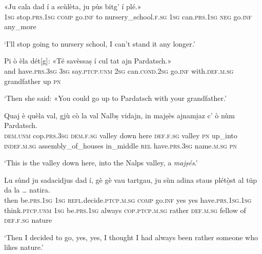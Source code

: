 \begin{linenumbers}
\gll  «Ju cala dad í a scùlèta, ju pùs bitg' í plé.»\\
 \textsc{1sg} stop.\textsc{prs.1sg} \textsc{comp} go.\textsc{inf} to nursery\_school.\textsc{f.sg} \textsc{1sg} can.\textsc{prs.1sg} \textsc{neg} go.\textsc{inf} any\_more  \\
\end{linenumbers}
\medskip
\glt `I’ll stop going to nursery school, I can’t stand it any longer.'
\medskip

\begin{linenumbers}
\gll  Pi ò èla dét[g]: «Té savèssaṣ í cul tat ajn Pardatsch.»  \\
and have.\textsc{prs.3sg} \textsc{3sg} say.\textsc{ptcp.unm} \textsc{2sg} can.\textsc{cond.2sg} go.\textsc{inf} with.\textsc{def.m.sg} grandfather up \textsc{pn}  \\
\end{linenumbers}
\medskip
\glt `Then she said: «You could go up to Pardatsch with your grandfather.'
\medskip

\begin{linenumbers}
\gll Quaj è quèla val, gjù cò la val Nalbṣ vidajn, in majṣès\footnotemark{}  ajnami̱az c' ò nùm Pardatsch.  \\
 \textsc{dem.unm} cop.\textsc{prs.3sg} \textsc{dem.f.sg} valley down here  \textsc{def.f.sg} valley  \textsc{pn} up\_into \textsc{indef.m.sg} assembly\_of\_houses in\_middle \textsc{rel} have.\textsc{prs.3sg} name.\textsc{m.sg} \textsc{pn}\\
\end{linenumbers}
\medskip
\glt `This is the valley down here, into the Nalps valley, a \textit{majṣés}.' 
\medskip

\begin{linenumbers}
\gll  Lu sùnd ju sadacidjus dad í, gè gè vau tartgau, ju sùn adina staus plétò̱st al tüp da la … natira.  \\
then be.\textsc{prs.1sg} \textsc{1sg} \textsc{refl.}decide.\textsc{ptcp.m.sg} \textsc{comp} go.\textsc{inf} yes yes have.\textsc{prs.1sg.1sg} think.\textsc{ptcp.unm} \textsc{1sg} be.\textsc{prs.1sg} always \textsc{cop.ptcp.m.sg} rather \textsc{def.m.sg} fellow of \textsc{def.f.sg} {} nature   \\
\end{linenumbers}
\medskip
\glt `Then I decided to go, yes, yes, I thought I had always been rather someone who likes nature.'

